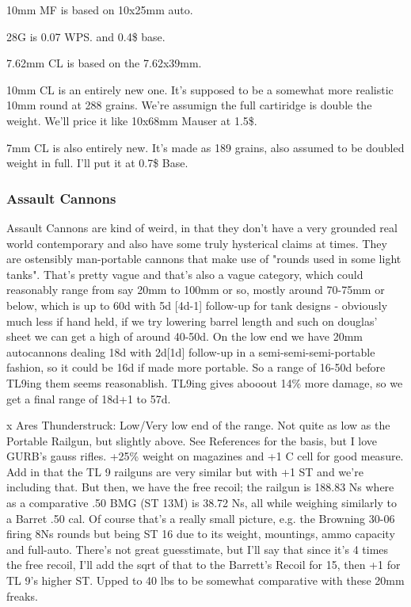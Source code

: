 \begin{multicols*}{2}
	 10mm MF is based on 10x25mm auto.
	 
	 28G is 0.07  WPS. and 0.4\$ base.
	 
	 7.62mm CL is based on the 7.62x39mm.
	 
	 10mm CL is an entirely new one. It's supposed to be a somewhat more realistic 10mm round at 288 grains. We're assumign the full cartiridge is double the weight. We'll price it like 10x68mm Mauser at 1.5\$.
	 
	 7mm CL is also entirely new. It's made as 189 grains, also assumed to be doubled weight in full. I'll put it at 0.7\$ Base.
	 	
	\subsubsection{Assault Cannons}
	
	Assault Cannons are kind of weird, in that they don't have a very grounded real world contemporary and also have some truly hysterical claims at times. They are ostensibly man-portable cannons that make use of "rounds used in some light tanks". That's pretty vague and that's also a vague category, which could reasonably range from say 20mm to 100mm or so, mostly around 70-75mm or below, which is up to 60d with 5d [4d-1] follow-up for tank designs - obviously much less if hand held, if we try lowering barrel length and such on douglas' sheet we can get a high of around 40-50d. On the low end we have 20mm autocannons dealing 18d with 2d[1d] follow-up in a semi-semi-semi-portable fashion, so it could be 16d if made more portable. So a range of 16-50d before TL9ing them seems reasonablish. TL9ing gives abooout 14\% more damage, so we get a final range of 18d+1 to 57d. 
	
	x Ares Thunderstruck: Low/Very low end of the range. Not quite as low as the Portable Railgun, but slightly above. See References for the basis, but I love GURB's gauss rifles. +25\% weight on magazines and +1 C cell for good measure. Add in that the TL 9 railguns are very similar but with +1 ST and we're including that. But then, we have the free recoil; the railgun is 188.83 Ns where as a comparative .50 BMG (ST 13M) is 38.72 Ns, all while weighing similarly to a Barret .50 cal. Of course that's a really small picture, e.g. the Browning 30-06 firing 8Ns rounds but being ST 16 due to its weight, mountings, ammo capacity and full-auto. There's not great guesstimate, but I'll say that since it's 4 times the free recoil, I'll add the sqrt of that to the Barrett's Recoil for 15, then +1 for TL 9's higher ST. Upped to 40 lbs to be somewhat comparative with these 20mm freaks.
	

\end{multicols*}
